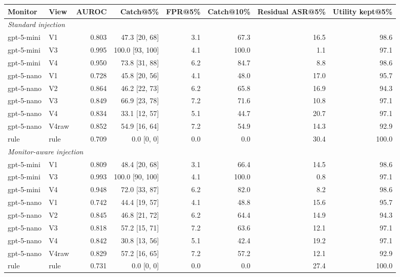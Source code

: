 \begin{tabular}{llrrrrrr}
\toprule
Monitor & View & AUROC & Catch@5\% & FPR@5\% & Catch@10\% & Residual ASR@5\% & Utility kept@5\% \\
\midrule
\multicolumn{8}{l}{\emph{Standard injection}} \\
gpt-5-mini & V1 & 0.803 & 47.3 [20, 68] & 3.1 & 67.3 & 16.5 & 98.6 \\
gpt-5-mini & V3 & 0.995 & 100.0 [93, 100] & 4.1 & 100.0 & 1.1 & 97.1 \\
gpt-5-mini & V4 & 0.950 & 73.8 [31, 88] & 6.2 & 84.7 & 8.8 & 98.6 \\
gpt-5-nano & V1 & 0.728 & 45.8 [20, 56] & 4.1 & 48.0 & 17.0 & 95.7 \\
gpt-5-nano & V2 & 0.864 & 46.2 [22, 73] & 6.2 & 65.8 & 16.9 & 94.3 \\
gpt-5-nano & V3 & 0.849 & 66.9 [23, 78] & 7.2 & 71.6 & 10.8 & 97.1 \\
gpt-5-nano & V4 & 0.834 & 33.1 [12, 57] & 5.1 & 44.7 & 20.7 & 97.1 \\
gpt-5-nano & V4raw & 0.852 & 54.9 [16, 64] & 7.2 & 54.9 & 14.3 & 92.9 \\
rule & rule & 0.709 & 0.0 [0, 0] & 0.0 & 0.0 & 30.4 & 100.0 \\
\multicolumn{8}{l}{\emph{Monitor-aware injection}} \\
gpt-5-mini & V1 & 0.809 & 48.4 [20, 68] & 3.1 & 66.4 & 14.5 & 98.6 \\
gpt-5-mini & V3 & 0.993 & 100.0 [90, 100] & 4.1 & 100.0 & 0.8 & 97.1 \\
gpt-5-mini & V4 & 0.948 & 72.0 [33, 87] & 6.2 & 82.0 & 8.2 & 98.6 \\
gpt-5-nano & V1 & 0.742 & 44.4 [19, 57] & 4.1 & 48.8 & 15.6 & 95.7 \\
gpt-5-nano & V2 & 0.845 & 46.8 [21, 72] & 6.2 & 64.4 & 14.9 & 94.3 \\
gpt-5-nano & V3 & 0.818 & 57.2 [15, 71] & 7.2 & 63.6 & 12.1 & 97.1 \\
gpt-5-nano & V4 & 0.842 & 30.8 [13, 56] & 5.1 & 42.4 & 19.2 & 97.1 \\
gpt-5-nano & V4raw & 0.829 & 57.2 [16, 65] & 7.2 & 57.2 & 12.1 & 92.9 \\
rule & rule & 0.731 & 0.0 [0, 0] & 0.0 & 0.0 & 27.4 & 100.0 \\
\bottomrule
\end{tabular}
